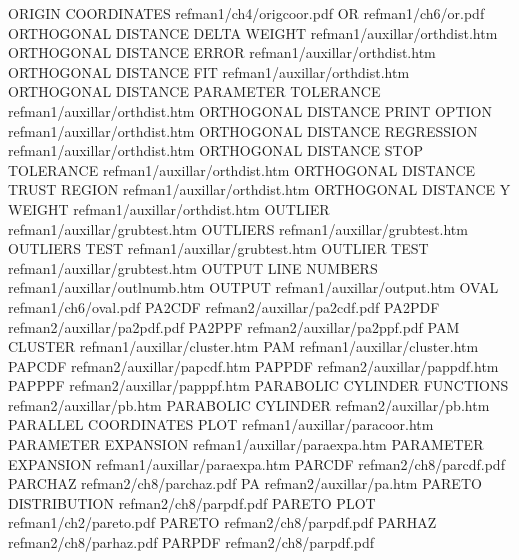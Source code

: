ORIGIN COORDINATES                      refman1/ch4/origcoor.pdf
OR                                      refman1/ch6/or.pdf
ORTHOGONAL DISTANCE DELTA WEIGHT        refman1/auxillar/orthdist.htm
ORTHOGONAL DISTANCE ERROR               refman1/auxillar/orthdist.htm
ORTHOGONAL DISTANCE FIT                 refman1/auxillar/orthdist.htm
ORTHOGONAL DISTANCE PARAMETER TOLERANCE refman1/auxillar/orthdist.htm
ORTHOGONAL DISTANCE PRINT OPTION        refman1/auxillar/orthdist.htm
ORTHOGONAL DISTANCE REGRESSION          refman1/auxillar/orthdist.htm
ORTHOGONAL DISTANCE STOP TOLERANCE      refman1/auxillar/orthdist.htm
ORTHOGONAL DISTANCE TRUST REGION        refman1/auxillar/orthdist.htm
ORTHOGONAL DISTANCE Y WEIGHT            refman1/auxillar/orthdist.htm
OUTLIER                                 refman1/auxillar/grubtest.htm
OUTLIERS                                refman1/auxillar/grubtest.htm
OUTLIERS TEST                           refman1/auxillar/grubtest.htm
OUTLIER TEST                            refman1/auxillar/grubtest.htm
OUTPUT LINE NUMBERS                     refman1/auxillar/outlnumb.htm
OUTPUT                                  refman1/auxillar/output.htm
OVAL                                    refman1/ch6/oval.pdf
PA2CDF                                  refman2/auxillar/pa2cdf.pdf
PA2PDF                                  refman2/auxillar/pa2pdf.pdf
PA2PPF                                  refman2/auxillar/pa2ppf.pdf
PAM CLUSTER                             refman1/auxillar/cluster.htm
PAM                                     refman1/auxillar/cluster.htm
PAPCDF                                  refman2/auxillar/papcdf.htm
PAPPDF                                  refman2/auxillar/pappdf.htm
PAPPPF                                  refman2/auxillar/papppf.htm
PARABOLIC CYLINDER FUNCTIONS            refman2/auxillar/pb.htm
PARABOLIC CYLINDER                      refman2/auxillar/pb.htm
PARALLEL COORDINATES PLOT               refman1/auxillar/paracoor.htm
PARAMETER EXPANSION                     refman1/auxillar/paraexpa.htm
PARAMETER EXPANSION                     refman1/auxillar/paraexpa.htm
PARCDF                                  refman2/ch8/parcdf.pdf
PARCHAZ                                 refman2/ch8/parchaz.pdf
PA                                      refman2/auxillar/pa.htm
PARETO DISTRIBUTION                     refman2/ch8/parpdf.pdf
PARETO PLOT                             refman1/ch2/pareto.pdf
PARETO                                  refman2/ch8/parpdf.pdf
PARHAZ                                  refman2/ch8/parhaz.pdf
PARPDF                                  refman2/ch8/parpdf.pdf
